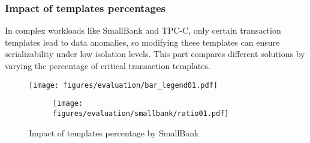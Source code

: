 \subsubsection{Impact of templates percentages}
\label{sec:evaluation:ratio}
In complex workloads like SmallBank and TPC-C, only certain transaction templates lead to data anomalies, so modifying these templates can ensure serializability under low isolation levels. This part compares different solutions by varying the percentage of critical transaction templates. %

\begin{figure}[]
    \centering
    \begin{minipage}{0.8\linewidth}
        \centering
        \texttt{[image: figures/evaluation/bar\_legend01.pdf]}
        \vspace{-5mm}
    \end{minipage}
    \begin{minipage}{0.95\linewidth}
        \centering
        \begin{subfigure}{0.95\linewidth}
            \texttt{[image: figures/evaluation/smallbank/ratio01.pdf]}
        \end{subfigure}
    \end{minipage}
    \vspace{-4mm}
    \caption{Impact of templates percentage by SmallBank}
    \label{fig:evaluation.sb.ratio}
    \vspace{-6mm}
\end{figure}

